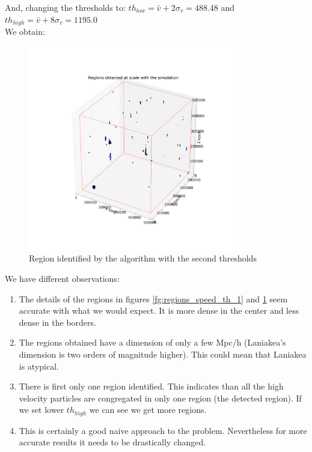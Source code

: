 \documentclass[12pt]{article}
\begin{document}
And, changing the thresholds to: 
$th_{low} = \bar{v} + 2  \sigma_{v} = 488.48$ and $th_{high} = \bar{v}  +  8 \sigma_{v} =1195.0 $\\
We obtain:
\begin{figure}[ht]
\begin{center}
\includegraphics[width=0.8\textwidth]{graphs/regions_big.png} %
\caption{Region identified by the algorithm with the second thresholds}
\label{fg:regions_speed_th_2}
\end{center}
\end{figure}
\FloatBarrier

We have different observations:\\
\begin{enumerate}
	\item The details of the regions in figures \ref{fg:regions_speed_th_1} and \ref{fg:regions_speed_th_2} seem accurate with what we would expect. It is more dense in the center and less dense in the borders.
	\item The regions obtained have a dimension of only a few Mpc/h (Laniakea's dimension is two orders of magnitude higher). This could mean that Laniakea is atypical. 
    \item There is first only one region identified. This indicates than all the high velocity particles are congregated in only one region (the detected region). If we set lower $th_{high}$ we can see we get more regions. 
    \item This is certainly a good naive approach to the problem. Nevertheless for more accurate results it needs to be drastically changed.
\end{enumerate}
\end{document}
